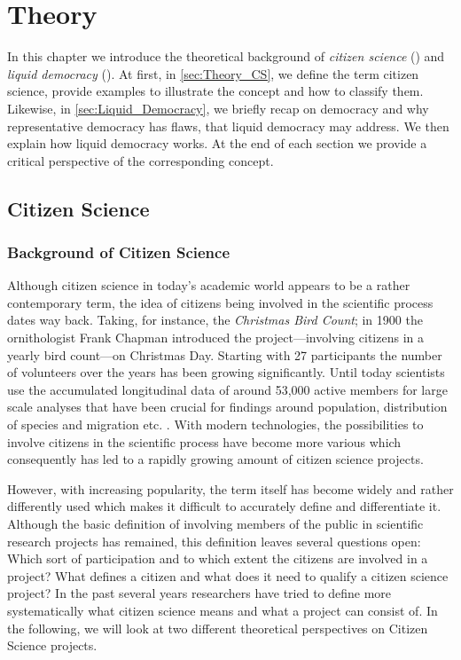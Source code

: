 \chapter{Theory}
\label{ch:Theory}

In this chapter we introduce the theoretical background of \textit{citizen science} () and \textit{liquid democracy} (). At first, in \autoref{sec:Theory_CS}, we define the term citizen science, provide examples to illustrate the concept and how to classify them. Likewise, in \autoref{sec:Liquid_Democracy}, we briefly recap on democracy and why representative democracy has flaws, that liquid democracy may address. We then explain how liquid democracy works. At the end of each section we provide a critical perspective of the corresponding concept.


\section{Citizen Science}
\label{sec:Theory_CS}
\subsection{Background of Citizen Science}
\label{ssec:Background_CS}
Although citizen science in today’s academic world appears to be a rather contemporary term, the idea of citizens being involved in the scientific process dates way back. Taking, for instance, the \textit{Christmas Bird Count}; in 1900 the ornithologist Frank Chapman introduced the project---involving citizens in a yearly bird count---on Christmas Day. Starting with 27 participants the number of volunteers over the years has been growing significantly. Until today scientists use the accumulated longitudinal data of around 53,000 active members for large scale analyses that have been crucial for findings around population, distribution of species and migration etc. \parencite{Lebaron2017}. With modern technologies, the possibilities to involve citizens in the scientific process have become more various which consequently has led to a rapidly growing amount of citizen science projects. 

However, with increasing popularity, the term itself has become widely and rather differently used which makes it difficult to accurately define and differentiate it. Although the basic definition of involving members of the public in scientific research projects has remained, this definition leaves several questions open: Which sort of participation and to which extent the citizens are involved in a project? What defines a citizen and what does it need to qualify a citizen science project? In the past several years researchers have tried to define more systematically what citizen science means and what a  project can consist of. In the following, we will look at two  different theoretical perspectives on Citizen Science projects. 



